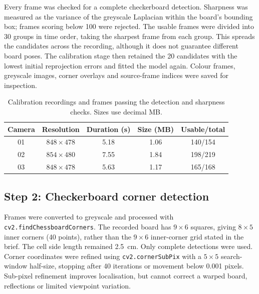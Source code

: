 \documentclass[conference]{IEEEtran}
\begin{document}
Every frame was checked for a complete checkerboard detection. Sharpness was measured as the variance of the greyscale Laplacian within the board's bounding box; frames scoring below 100 were rejected. The usable frames were divided into 30 groups in time order, taking the sharpest frame from each group. This spreads the candidates across the recording, although it does not guarantee different board poses. The calibration stage then retained the 20 candidates with the lowest initial reprojection errors and fitted the model again. Colour frames, greyscale images, corner overlays and source-frame indices were saved for inspection.

\begin{table}[htbp]
\caption{Calibration recordings and frames passing the detection and sharpness checks. Sizes use decimal MB.}
\label{tab:recordings}
\centering
\begin{tabular}{c c c c c}
\hline
Camera & Resolution & Duration (s) & Size (MB) & Usable/total \\
\hline
01 & $848\times478$ & 5.18 & 1.06 & 140/154 \\
02 & $854\times480$ & 7.55 & 1.84 & 198/219 \\
03 & $848\times478$ & 5.63 & 1.17 & 165/168 \\
\hline
\end{tabular}
\end{table}

\subsection{Step 2: Checkerboard corner detection}
Frames were converted to greyscale and processed with \texttt{cv2.findChessboardCorners}. The recorded board has $9\times6$ squares, giving $8\times5$ inner corners (40 points), rather than the $9\times6$ inner-corner grid stated in the brief. The cell side length remained 2.5~cm. Only complete detections were used. Corner coordinates were refined using \texttt{cv2.cornerSubPix} with a $5\times5$ search-window half-size, stopping after 40 iterations or movement below 0.001 pixels. Sub-pixel refinement improves localisation, but cannot correct a warped board, reflections or limited viewpoint variation.
\end{document}

